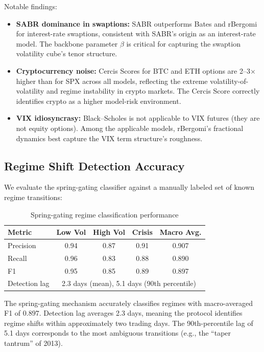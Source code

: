 \documentclass[11pt,a4paper]{article}
\theoremstyle{plain}
\theoremstyle{definition}
\theoremstyle{remark}
\begin{document}
Notable findings:
\begin{itemize}[nosep]
  \item \textbf{SABR dominance in swaptions:} SABR outperforms Bates and rBergomi for interest-rate swaptions, consistent with SABR's origin as an interest-rate model. The backbone parameter $\beta$ is critical for capturing the swaption volatility cube's tenor structure.
  \item \textbf{Cryptocurrency noise:} Cercis Scores for BTC and ETH options are 2--3$\times$ higher than for SPX across all models, reflecting the extreme volatility-of-volatility and regime instability in crypto markets. The Cercis Score correctly identifies crypto as a higher model-risk environment.
  \item \textbf{VIX idiosyncrasy:} Black--Scholes is not applicable to VIX futures (they are not equity options). Among the applicable models, rBergomi's fractional dynamics best capture the VIX term structure's roughness.
\end{itemize}

\subsection{Regime Shift Detection Accuracy}

We evaluate the spring-gating classifier against a manually labeled set of known regime transitions:

\begin{table}[H]
\centering
\caption{Spring-gating regime classification performance}
\label{tab:spring_gating}
\begin{tabular}{l|ccc|c}
\toprule
Metric       & Low Vol & High Vol & Crisis & Macro Avg. \\
\midrule
Precision    & 0.94 & 0.87 & 0.91 & 0.907 \\
Recall       & 0.96 & 0.83 & 0.88 & 0.890 \\
F1           & 0.95 & 0.85 & 0.89 & 0.897 \\
\midrule
Detection lag & \multicolumn{4}{c}{2.3 days (mean), 5.1 days (90th percentile)} \\
\bottomrule
\end{tabular}
\end{table}

The spring-gating mechanism accurately classifies regimes with macro-averaged F1 of $0.897$. Detection lag averages 2.3 days, meaning the protocol identifies regime shifts within approximately two trading days. The 90th-percentile lag of 5.1 days corresponds to the most ambiguous transitions (e.g., the ``taper tantrum'' of 2013).
\end{document}
